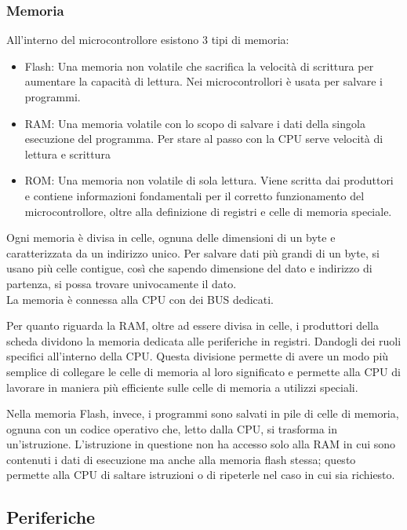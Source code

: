 \subsubsection{Memoria}
All'interno del microcontrollore esistono 3 tipi di memoria:
\begin{itemize}
    \item Flash: Una memoria non volatile che sacrifica la velocità di scrittura per aumentare la capacità di lettura. Nei microcontrollori è usata per salvare i programmi.
    \item RAM: Una memoria volatile con lo scopo di salvare i dati della singola esecuzione del programma. Per stare al passo con la CPU serve velocità di lettura e scrittura
    \item ROM: Una memoria non volatile di sola lettura. Viene scritta dai produttori e contiene informazioni fondamentali per il corretto funzionamento del microcontrollore, oltre alla definizione di registri e celle di memoria speciale.
\end{itemize}
Ogni memoria è divisa in celle, ognuna delle dimensioni di un byte e caratterizzata da un indirizzo unico. Per salvare dati più grandi di un byte, si usano più celle contigue, così che sapendo dimensione del dato e indirizzo di partenza, si possa trovare univocamente il dato.\\
La memoria è connessa alla CPU con dei BUS dedicati.

Per quanto riguarda la RAM, oltre ad essere divisa in celle, i produttori della scheda dividono la memoria dedicata alle periferiche in registri. Dandogli dei ruoli specifici all'interno della CPU. Questa divisione permette di avere un modo più semplice di collegare le celle di memoria al loro significato e permette alla CPU di lavorare in maniera più efficiente sulle celle di memoria a utilizzi speciali.

Nella memoria Flash, invece, i programmi sono salvati in pile di celle di memoria, ognuna con un codice operativo che, letto dalla CPU, si trasforma in un'istruzione. L'istruzione in questione non ha accesso solo alla RAM in cui sono contenuti i dati di esecuzione ma anche alla memoria flash stessa; questo permette alla CPU di saltare istruzioni o di ripeterle nel caso in cui sia richiesto.



\subsection{Periferiche}

